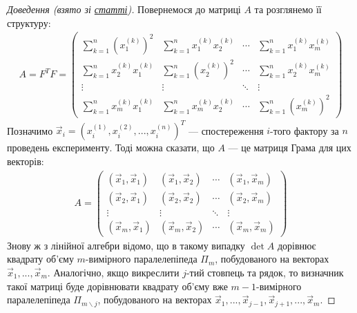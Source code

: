 \begin{proof}[Доведення (взято зі \href{http://esgi-miet.ru/images/Stati20161/18-20GafarovaZavialovaMustafin.pdf}{статті})]
    Повернемося до матриці $A$ та розглянемо її структуру:
    \begin{gather*}
        A = F^T F = \begin{pmatrix}
            \sum\limits_{k=1}^n \left(x_1^{(k)}\right)^2 & \sum\limits_{k=1}^n x_1^{(k)} x_2^{(k)} & \cdots & \sum\limits_{k=1}^n x_1^{(k)} x_m^{(k)} \\
            \sum\limits_{k=1}^n x_2^{(k)} x_1^{(k)} & \sum\limits_{k=1}^n \left(x_2^{(k)}\right)^2 & \cdots & \sum\limits_{k=1}^n x_2^{(k)} x_m^{(k)} \\
            \vdots & \vdots & \ddots & \vdots \\
            \sum\limits_{k=1}^n x_m^{(k)} x_1^{(k)} & \sum\limits_{k=1}^n x_m^{(k)} x_2^{(k)} & \cdots & \sum\limits_{k=1}^n \left(x_m^{(k)}\right)^2
        \end{pmatrix}
    \end{gather*}
    Позначимо $\vec{x}_i = \left(
        x_i^{(1)}, x_i^{(2)}, ..., x_i^{(n)}
    \right)^T$ --- спостереження $i$-того фактору за $n$ проведень експерименту. Тоді можна сказати, що $A$ ---
    це матриця Грама для цих векторів:
    \begin{gather*}
        A = \begin{pmatrix}
            (\vec{x}_1, \vec{x}_1) & (\vec{x}_1, \vec{x}_2) & \cdots & (\vec{x}_1, \vec{x}_m) \\
            (\vec{x}_2, \vec{x}_1) & (\vec{x}_2, \vec{x}_2) & \cdots & (\vec{x}_2, \vec{x}_m) \\
            \vdots & \vdots & \ddots & \vdots \\
            (\vec{x}_m, \vec{x}_1) & (\vec{x}_m, \vec{x}_2) & \cdots & (\vec{x}_m, \vec{x}_m)
        \end{pmatrix}
    \end{gather*}
    Знову ж з лінійної алгебри відомо, що в такому випадку $\det A$ дорівнює квадрату об'єму
    $m$-вимірного паралелепіпеда $\Pi_m$, побудованого на векторах $\vec{x}_1, ..., \vec{x}_m$. Аналогічно,
    якщо викреслити $j$-тий стовпець та рядок, то визначник такої матриці буде дорівнювати квадрату об'єму 
    вже $m-1$-вимірного паралелепіпеда $\Pi_{m \backslash j}$, побудованого на векторах 
    $\vec{x}_1, ..., \vec{x}_{j-1}, \vec{x}_{j+1}, ..., \vec{x}_m$.


\end{proof}
